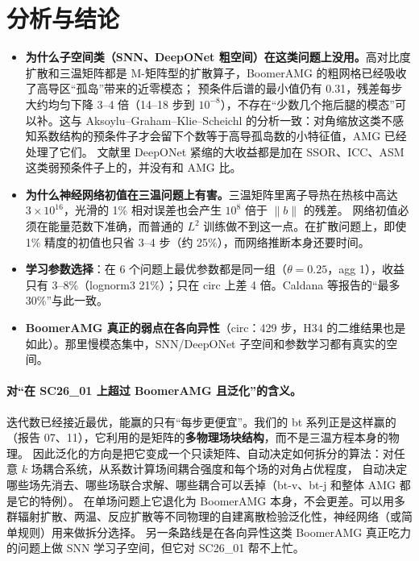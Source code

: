 \documentclass[11pt,a4paper]{ctexart}
\begin{document}
\section{分析与结论}
\begin{itemize}
\item \textbf{为什么子空间类（SNN、DeepONet 粗空间）在这类问题上没用。}高对比度扩散和三温矩阵都是 M-矩阵型的扩散算子，BoomerAMG 的粗网格已经吸收了高导区“孤岛”带来的近零模态；
预条件后谱的最小值仍有 0.31，残差每步大约均匀下降 3--4 倍（14--18 步到 $10^{-8}$），不存在“少数几个拖后腿的模态”可以补。这与 Aksoylu--Graham--Klie--Scheichl 的分析一致：对角缩放这类不感知系数结构的预条件子才会留下个数等于高导孤岛数的小特征值，AMG 已经处理了它们。
文献里 DeepONet 紧缩的大收益都是加在 SSOR、ICC、ASM 这类弱预条件子上的，并没有和 AMG 比。
\item \textbf{为什么神经网络初值在三温问题上有害。}三温矩阵里离子导热在热核中高达 $3\times10^{16}$，光滑的 1\% 相对误差也会产生 $10^8$ 倍于 $\|b\|$ 的残差。
网络初值必须在能量范数下准确，而普通的 $L^2$ 训练做不到这一点。在扩散问题上，即使 1\% 精度的初值也只省 3--4 步（约 25\%），而网络推断本身还要时间。
\item \textbf{学习参数选择}：在 6 个问题上最优参数都是同一组（$\theta=0.25$，agg 1），收益只有 3--8\%（lognorm3 21\%）；只在 circ 上差 4 倍。Caldana 等报告的“最多 30\%”与此一致。
\item \textbf{BoomerAMG 真正的弱点在各向异性}（circ：429 步，H34 的二维结果也是如此）。那里慢模态集中，SNN/DeepONet 子空间和参数学习都有真实的空间。
\end{itemize}
\paragraph{对“在 SC26\_01 上超过 BoomerAMG 且泛化”的含义。}
迭代数已经接近最优，能赢的只有“每步更便宜”。我们的 bt 系列正是这样赢的（报告 07、11），它利用的是矩阵的\textbf{多物理场块结构}，而不是三温方程本身的物理。
因此泛化的方向是把它变成一个只读矩阵、自动决定如何拆分的算法：对任意 $k$ 场耦合系统，从系数计算场间耦合强度和每个场的对角占优程度，
自动决定哪些场先消去、哪些场联合求解、哪些耦合可以丢掉（bt-v、bt-j 和整体 AMG 都是它的特例）。
在单场问题上它退化为 BoomerAMG 本身，不会更差。可以用多群辐射扩散、两温、反应扩散等不同物理的自建离散检验泛化性，神经网络（或简单规则）用来做拆分选择。
另一条路线是在各向异性这类 BoomerAMG 真正吃力的问题上做 SNN 学习子空间，但它对 SC26\_01 帮不上忙。
\end{document}
